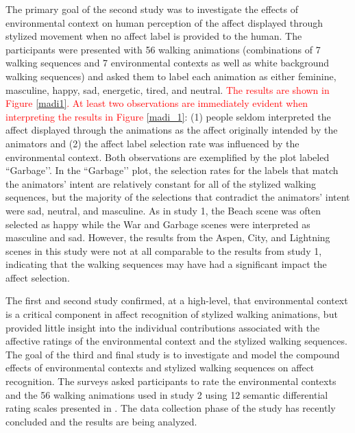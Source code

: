 \documentclass[arts,article,submit,moreauthors,pdftex,10pt,a4paper]{mdpi}
\begin{document}
The primary goal of the second study was to investigate the effects of environmental context on human perception of the affect displayed through stylized movement when no affect label is provided to the human. The participants were presented with 56 walking animations (combinations of 7 walking sequences and 7 environmental contexts as well as white background walking sequences) and asked them to label each animation as either feminine, masculine, happy, sad, energetic, tired, and neutral. \textcolor{red}{The results are shown in Figure \ref{madi1}. At least two observations are immediately evident when interpreting the results in Figure \ref{madi_1}}: (1) people seldom interpreted the affect displayed through the animations as the affect originally intended by the animators and (2) the affect label selection rate was influenced by the environmental context. Both observations are exemplified by the plot labeled ``Garbage’’. In the ``Garbage’’ plot, the selection rates for the labels that match the animators’ intent are relatively constant for all of the stylized walking sequences, but the majority of the selections that contradict the animators’ intent were sad, neutral, and masculine. As in study 1, the Beach scene was often selected as happy while the War and Garbage scenes were interpreted as masculine and sad. However, the results from the Aspen, City, and Lightning scenes in this study were not at all comparable to the results from study 1, indicating that the walking sequences may have had a significant impact the affect selection. 

The first and second study confirmed, at a high-level, that environmental context is a critical component in affect recognition of stylized walking animations, but provided little insight into the individual contributions associated with the affective ratings of the environmental context and the stylized walking sequences. The goal of the third and final study is to investigate and model the compound effects of environmental contexts and stylized walking sequences on affect recognition. The surveys asked participants to rate the environmental contexts and the 56 walking animations used in study 2 using 12 semantic differential rating scales presented in \cite{bradley1994measuring}. The data collection phase of the study has recently concluded and the results are being analyzed. 
\end{document}
